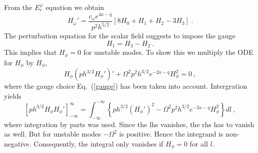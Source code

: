 \documentclass[showpacs,preprintnumbers,amsmath,amssymb,floatfix]{revtex4}
\newcommand{\vphi}{\varphi}
\begin{document}
{From} the $E_r^\vphi$ equation we obtain
\begin{equation}
H_\omega' = \frac{c_\omega e^{4a-q}}{p^2 h^{5/2}}\left[8H_0 + H_1 + H_2 - 3 H_3\right] \ .
\label{hop}
\end{equation}
The perturbation equation for the scalar field suggests to impose the gauge
\begin{equation}
H_1 = H_3-H_2\ .
\label{gauge}
\end{equation}
This implies that
$H_\phi = 0$ for unstable modes. 
To show this we multiply 
the ODE for $H_\phi$ by $H_\phi$,
\begin{equation}
H_\phi \left( p h^{3/2} H_\phi'\right)' 
+\Omega^2 p^2 h^{3/2} e^{-2a-q} H_\phi^2 = 0 \ ,
\label{eqhphi}
\end{equation}
where the gauge choice Eq.~(\ref{gauge}) has been taken into account.
Intergration yields 
\begin{equation}
 \left[ p h^{3/2}H_\phi H_\phi'\right]_{-\infty}^{\infty} = 
 \int_{-\infty}^{-\infty} \left\{p h^{3/2} (H_\phi')^2 
                     -\Omega^2 p^2 h^{3/2} e^{-2a-q} H_\phi^2\right\}dl \ ,
\label{inteqhphi}
\end{equation}
where integration by parts was used. 
Since the lhs vanishes, the rhs has to vanish as well.
But for unstable modes $ -\Omega^2$ is positive. 
Hence the integrand is non-negative.
Consequently, the integral only vanishes if $H_\phi=0$ for all $l$.
\end{document}
